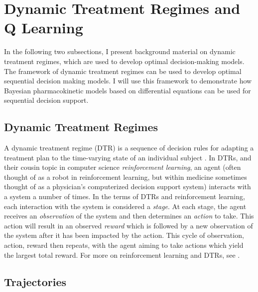 \section{Dynamic Treatment Regimes and Q Learning}



In the following two subsections, I present background material on dynamic treatment regimes, which are used to develop optimal decision-making models.  The framework of dynamic treatment regimes can be used to develop optimal sequential decision making models.  I will use this framework to demonstrate how Bayesian pharmacokinetic models based on differential equations can be used for sequential decision support.

\subsection{Dynamic Treatment Regimes}


A dynamic treatment regime (DTR) is a sequence of decision rules for adapting a treatment plan to the time-varying state of an individual subject \cite{chakraborty2013statistical}. In DTRs, and their cousin topic in computer science \textit{reinforcement learning}, an agent (often thought of as a robot in reinforcement learning, but within medicine sometimes thought of as a physician’s computerized decision support system) interacts with a system a number of times. In the terms of DTRs and reinforcement learning, each interaction with the system is considered a \textit{stage}.  At each stage, the agent receives an \textit{observation} of the system and then determines an \textit{action} to take. This action will result in an observed \textit{reward} which is followed by a new observation of the system after it has been impacted by the action.  This cycle of observation, action, reward then repeats, with the agent aiming to take actions which yield the largest total reward. For more on reinforcement learning and DTRs, see \cite{lizotte17reinforcement, chakraborty2013statistical}.

\subsection{Trajectories}

